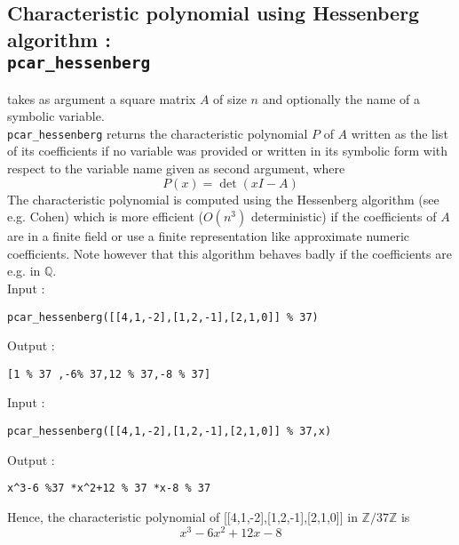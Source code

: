 \documentclass[a4paper,11pt]{book}
\begin{document}
\subsection{Characteristic polynomial using Hessenberg algorithm :\\
 {\tt pcar\_hessenberg}}
 takes as argument a square 
matrix $A$ of size $n$ and optionally the name of a symbolic variable.\\
{\tt pcar\_hessenberg} returns the characteristic polynomial $P$ of $A$ written
as the list of its coefficients if no variable was provided
or written in its symbolic form with respect to the variable name given 
as second argument, where
\[ P(x)=\det(xI-A) \]
The characteristic polynomial is computed using the Hessenberg algorithm
(see e.g. Cohen) which is more efficient ($O(n^3)$ deterministic) if 
the coefficients of $A$ are in a finite field or use a finite 
representation like approximate numeric coefficients. Note however that
this algorithm behaves badly if the coefficients are e.g. in $\mathbb Q$.\\
Input :
\begin{center}{\tt pcar\_hessenberg([[4,1,-2],[1,2,-1],[2,1,0]] \% 37)}\end{center}
Output :
\begin{center}{\tt[1 \% 37 ,-6\% 37,12 \% 37,-8 \% 37]}\end{center}
Input :
\begin{center}{\tt pcar\_hessenberg([[4,1,-2],[1,2,-1],[2,1,0]] \% 37,x)}\end{center}
Output :
\begin{center}{\tt x\verb|^|3-6 \%37 *x\verb|^|2+12 \% 37 *x-8 \% 37}\end{center}
Hence, the characteristic polynomial of [[4,1,-2],[1,2,-1],[2,1,0]] in
$\mathbb Z/37 \mathbb Z$ is
\[ x^3-6x^2+12x-8 \]
\end{document}
